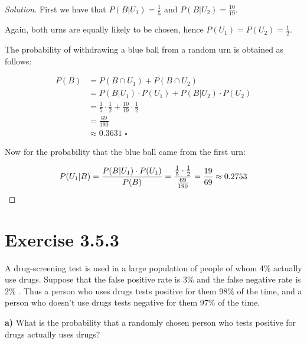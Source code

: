 \documentclass[titlepage, letterpaper, fleqn]{article}
\newcommand{\spacepls}{\vspace{5mm}}
\renewcommand\qedsymbol{\(\blacksquare\)}
\newenvironment{solution}
{\renewcommand\qedsymbol{$\square$}\begin{proof}[Solution]}
{\end{proof}}
\begin{document}
\begin{solution}
First we have that \(P(B|U_1) = \frac{1}{5}\) and \(P(B|U_2) = \frac{10}{19}\).

Again, both urns are equally likely to be chosen, hence \(P(U_1) = P(U_2) = \frac{1}{2}\).

The probability of withdrawing a blue ball from a random urn is obtained as follows:

\begin{align*}
P(B) & = P(B \cap U_1) + P(B \cap U_2)
\\ & = P(B|U_1) \cdot P(U_1) + P(B|U_2) \cdot P(U_2)
\\ & = \frac{1}{5} \cdot \frac{1}{2} + \frac{10}{19} \cdot \frac{1}{2}
\\ & = \frac{69}{190}
\\ & \approx 0.3631 \,\,\square
\end{align*}

Now for the probability that the blue ball came from the first urn:

\[P(U_1|B) = \frac{P(B|U_1) \cdot P(U_1)}{P(B)} = \frac{\frac{1}{5} \cdot \frac{1}{2}}{\frac{69}{190}} = \frac{19}{69} \approx 0.2753 \qedhere\]

\end{solution}

\spacepls

\section{Exercise 3.5.3}

{\large A drug-screening test is used in a large population of people of whom 4\% actually use drugs.
Suppose that the false positive rate is 3\% and the false negative rate is 2\% .
Thus a person who uses drugs tests positive for them 98\% of the time,
and a person who doesn't use drugs tests negative for them 97\% of the time.

\textbf{a)} What is the probability that a randomly chosen person who tests positive for drugs actually uses drugs?}
\end{document}
